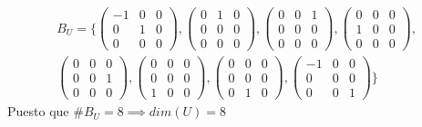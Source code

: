 \documentclass{article}
\begin{document}
\begin{equation}
    \begin{split}
        B_{U} = \{ \begin{pmatrix}
        -1 & 0 & 0 \\ 0 & 1 & 0\\ 0 & 0 & 0
        \end{pmatrix}, \begin{pmatrix}
        0 & 1 & 0 \\0 & 0 & 0\\0 & 0 & 0
        \end{pmatrix}, \begin{pmatrix}
        0 & 0 & 1\\0 & 0 & 0\\0 & 0 & 0
        \end{pmatrix}, \begin{pmatrix}
        0 & 0 & 0\\1 & 0 & 0\\0 & 0 & 0
        \end{pmatrix},\\ \begin{pmatrix}
        0 & 0 & 0\\0 & 0 & 1\\0 & 0 & 0
        \end{pmatrix}, \begin{pmatrix}
        0 & 0 & 0\\0 & 0 & 0\\1 & 0 & 0
        \end{pmatrix}, \begin{pmatrix}
        0 & 0 & 0\\0 & 0 & 0\\0 & 1 & 0
        \end{pmatrix}, \begin{pmatrix}
        -1 & 0 & 0\\0 & 0 & 0\\0 & 0 & 1
        \end{pmatrix} \}
    \end{split}
\end{equation}
Puesto que $\# B_{U} = 8 \implies dim(U) = 8$
\end{document}

